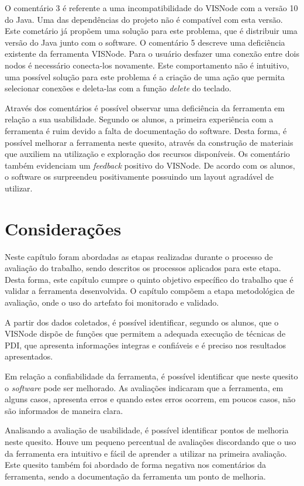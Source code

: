 \documentclass[
	12pt,				%
	oneside,			%
	a4paper,			%
	english,			%
	french,				%
	spanish,			%
	brazil,				%
	]{abntex2}
\begin{document}
O comentário 3 é referente a uma incompatibilidade do VISNode com a versão 10 do Java. Uma das dependências do projeto não é compatível com esta versão. Este cometário já propõem uma solução para este problema, que é distribuir uma versão do Java junto com o software. O comentário 5 descreve uma deficiência existente da ferramenta VISNode. Para o usuário desfazer uma conexão entre dois nodos é necessário conecta-los novamente. Este comportamento não é intuitivo, uma possível solução para este problema é a criação de uma ação que permita selecionar conexões e deleta-las com a função \textit{delete} do teclado.

Através dos comentários é possível observar uma deficiência da ferramenta em relação a sua usabilidade. Segundo os alunos, a primeira experiência com a ferramenta é ruim devido a falta de documentação do software. Desta forma, é possível melhorar a ferramenta neste quesito, através da construção de materiais que auxiliem na utilização e exploração dos recursos disponíveis. Os comentário também evidenciam um \textit{feedback} positivo do VISNode. De acordo com os alunos, o software os surpreendeu positivamente possuindo um layout agradável de utilizar.

\section{Considerações}

Neste capítulo foram abordadas as etapas realizadas durante o processo de avaliação do trabalho, sendo descritos os processos aplicados para este etapa. Desta forma, este capítulo cumpre o quinto objetivo específico do trabalho que é validar a ferramenta desenvolvida. O capítulo compõem a etapa metodológica de avaliação, onde o uso do artefato foi monitorado e validado.

A partir dos dados coletados, é possível identificar, segundo os alunos, que o VISNode dispõe de funções que permitem a adequada execução de técnicas de PDI,
que apresenta informações integras e confiáveis e é preciso nos resultados apresentados.

Em relação a confiabilidade da ferramenta, é possível identificar que neste quesito o \textit{software} pode ser melhorado. As avaliações indicaram que a ferramenta, em alguns casos, apresenta erros e quando estes erros ocorrem, em poucos casos, não são informados de maneira clara.

Analisando a avaliação de usabilidade, é possível identificar pontos de melhoria neste quesito. Houve um pequeno percentual de avaliações discordando que o uso da ferramenta era intuitivo e fácil de aprender a utilizar na primeira avaliação. Este quesito também foi abordado de forma negativa nos comentários da ferramenta, sendo a documentação da ferramenta um ponto de melhoria.
\end{document}
